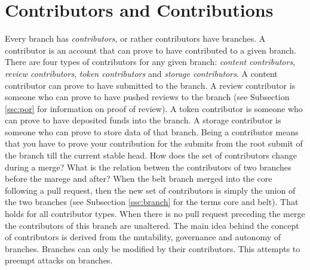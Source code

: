 
\section{Contributors and Contributions}
\label{ssc:contributors}

Every branch has \textit{contributors}, or rather contributors have branches. A contributor is an account that can prove to have contributed to a given branch. There are four types of contributors for any given branch: \textit{content contributors}, \textit{review contributors}, \textit{token contributors} and \textit{storage contributors}. A content contributor can prove to have submitted to the branch. A review contributor is someone who can prove to have pushed reviews to the branch (see Subsection \ref{ssc:por} for information on proof of review). A token contributor is someone who can prove to have deposited funds into the branch. A storage contributor is someone who can prove to store data of that branch. Being a contributor means that you have to prove your contribution for the submits from the root submit of the branch till the current stable head.
How does the set of contributors change during a merge? What is the relation betwen the contributors of two branches before the marege and after? When the belt branch merged into the core following a pull request, then the new set of contributors is simply the union of the two branches (see Subsection \ref{ssc:branch} for the terms core and belt). That holds for all contributor types. When there is no pull request preceding the merge the contributors of this branch are unaltered.
The main idea behind the concept of contributors is derived from the mutability, governance and autonomy of branches. Branches can only be modified by their contributors. This attempts to preempt attacks on branches.

% 

% 
% 
% 
% 
% 



